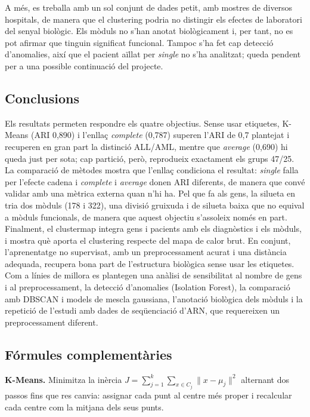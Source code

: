 \documentclass[a4paper,11pt]{article}
\begin{document}
A més, es treballa amb un sol conjunt de dades petit, amb mostres de diversos hospitals, de manera que el clustering podria no distingir els efectes de laboratori del senyal biològic. Els mòduls no s'han anotat biològicament i, per tant, no es pot afirmar que tinguin significat funcional. Tampoc s'ha fet cap detecció d'anomalies, així que el pacient aïllat per \emph{single} no s'ha analitzat; queda pendent per a una possible continuació del projecte.


\subsection{Conclusions}

Els resultats permeten respondre els quatre objectius. Sense usar etiquetes, K-Means (ARI 0,890) i l'enllaç \emph{complete} (0,787) superen l'ARI de 0,7 plantejat i recuperen en gran part la distinció ALL/AML, mentre que \emph{average} (0,690) hi queda just per sota; cap partició, però, reprodueix exactament els grups 47/25. La comparació de mètodes mostra que l'enllaç condiciona el resultat: \emph{single} falla per l'efecte cadena i \emph{complete} i \emph{average} donen ARI diferents, de manera que convé validar amb una mètrica externa quan n'hi ha. Pel que fa als gens, la silueta en tria dos mòduls (178 i 322), una divisió gruixuda i de silueta baixa que no equival a mòduls funcionals, de manera que aquest objectiu s'assoleix només en part. Finalment, el clustermap integra gens i pacients amb els diagnòstics i els mòduls, i mostra què aporta el clustering respecte del mapa de calor brut. En conjunt, l'aprenentatge no supervisat, amb un preprocessament acurat i una distància adequada, recupera bona part de l'estructura biològica sense usar les etiquetes. Com a línies de millora es plantegen una anàlisi de sensibilitat al nombre de gens i al preprocessament, la detecció d'anomalies (Isolation Forest), la comparació amb DBSCAN i models de mescla gaussiana, l'anotació biològica dels mòduls i la repetició de l'estudi amb dades de seqüenciació d'ARN, que requereixen un preprocessament diferent.

\subsection{Fórmules complementàries}
\label{marti-ann:formules}


\textbf{K-Means.} Minimitza la inèrcia $J=\sum_{j=1}^{k}\sum_{x\in C_j}\lVert x-\mu_j\rVert^2$ alternant dos passos fins que res canvia: assignar cada punt al centre més proper i recalcular cada centre com la mitjana dels seus punts.
\end{document}

